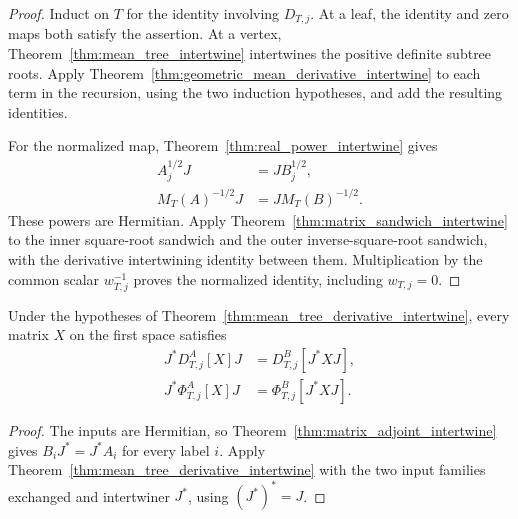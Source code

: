 \begin{proof}
  \leanok
  Induct on $T$ for the identity involving $D_{T,j}$.
  At a leaf, the identity and zero maps both satisfy the assertion.
  At a vertex, Theorem~\ref{thm:mean_tree_intertwine} intertwines the
  positive definite subtree roots. Apply
  Theorem~\ref{thm:geometric_mean_derivative_intertwine} to each term
  in the recursion, using the two induction hypotheses, and add the
  resulting identities.

  For the normalized map, Theorem~\ref{thm:real_power_intertwine} gives
  \begin{align}
    A_j^{1/2}J&=JB_j^{1/2}, \\
    M_T(A)^{-1/2}J&=JM_T(B)^{-1/2}.
  \end{align}
  These powers are Hermitian. Apply
  Theorem~\ref{thm:matrix_sandwich_intertwine} to the inner square-root
  sandwich and the outer inverse-square-root sandwich, with the
  derivative intertwining identity between them. Multiplication by the
  common scalar $w_{T,j}^{-1}$ proves the normalized identity, including
  $w_{T,j}=0$.
\end{proof}

\begin{theorem}
  \label{thm:mean_tree_derivative_compress}
  \leanok
  Under the hypotheses of Theorem~\ref{thm:mean_tree_derivative_intertwine},
  every matrix $X$ on the first space satisfies
  \begin{align}
    J^*D_{T,j}^A[X]J&=D_{T,j}^B[J^*XJ], \\
    J^*\Phi_{T,j}^A[X]J&=\Phi_{T,j}^B[J^*XJ].
  \end{align}
\end{theorem}

\begin{proof}
  \leanok
  The inputs are Hermitian, so
  Theorem~\ref{thm:matrix_adjoint_intertwine} gives $B_iJ^*=J^*A_i$
  for every label $i$. Apply
  Theorem~\ref{thm:mean_tree_derivative_intertwine} with the two input
  families exchanged and intertwiner $J^*$, using $(J^*)^*=J$.
\end{proof}
